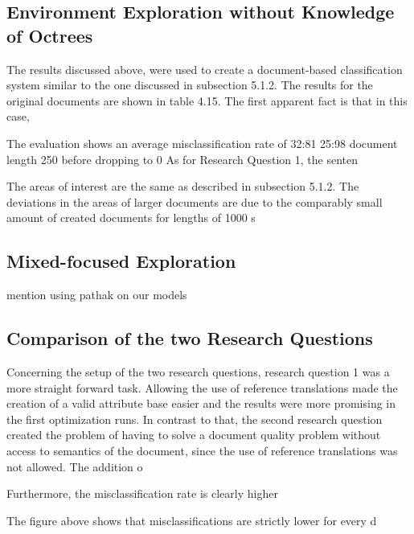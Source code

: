     \subsection{Environment Exploration without Knowledge of Octrees}
        The results discussed above, were used to create a document-based classiﬁcation system
        similar to the one discussed in subsection 5.1.2. The results for the original documents are
        shown in table 4.15. The ﬁrst apparent fact is that in this case,
        
        The evaluation shows an average misclassiﬁcation rate of 32:81%
        25:98%
        document length 250 before dropping to 0%
        As for Research Question 1, the senten
        
        
        The areas of interest are the same as described in subsection 5.1.2. The deviations in the
        areas of larger documents are due to the comparably small amount of created documents
        for lengths of 1000 s

    \subsection{Mixed-focused Exploration} \label{chap5:mixed-focused}
    
            mention using pathak on our models

    \subsection{Comparison of the two Research Questions}

        Concerning the setup of the two research questions, research question 1 was a more
        straight forward task. Allowing the use of reference translations made the creation of
        a valid attribute base easier and the results were more promising in the ﬁrst optimization
        runs. In contrast to that, the second research question created the problem of having to
        solve a document quality problem without access to semantics of the document, since the
        use of reference translations was not allowed. The addition o
        
        
        Furthermore, the misclassiﬁcation rate is clearly higher 
        
        
        The ﬁgure above shows that misclassiﬁcations are strictly lower for every d
        
